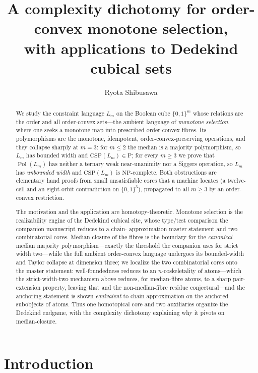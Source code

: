 \documentclass[11pt]{amsart}
\title[A complexity dichotomy for order-convex monotone selection]
{A complexity dichotomy for order-convex monotone selection,\\
 with applications to Dedekind cubical sets}
\author{Ryota Shibusawa}
\theoremstyle{plain}
\theoremstyle{definition}
\DeclareMathOperator{\Pol}{Pol}
\newcommand{\B}{\{0,1\}}
\begin{document}
\begin{abstract}
  We study the constraint language $L_m$ on the Boolean cube $\B^m$ whose
  relations are the order and all order-convex sets---the ambient
  language of \emph{monotone selection}, where one seeks a monotone map
  into prescribed order-convex fibres.  Its polymorphisms are the
  monotone, idempotent, order-convex-preserving operations, and they
  collapse sharply at $m=3$: for $m\le2$ the median is a majority
  polymorphism, so $L_m$ has bounded width and $\mathrm{CSP}(L_m)\in
  \mathrm P$; for every $m\ge3$ we prove that $\Pol(L_m)$ has neither a
  ternary weak near-unanimity nor a Siggers operation, so $L_m$ has
  \emph{unbounded width} and $\mathrm{CSP}(L_m)$ is
  $\mathrm{NP}$-complete.  Both obstructions are elementary hand proofs
  from small unsatisfiable cores that a machine locates (a twelve-cell
  and an eight-orbit contradiction on $\B^3$), propagated to all $m\ge3$
  by an order-convex restriction.

  The motivation and the application are homotopy-theoretic.  Monotone
  selection is the realizability engine of the Dedekind cubical site,
  whose type/test comparison the companion manuscript reduces to a chain-
  approximation master statement and two combinatorial cores.
  Median-closure of the fibres is the boundary for the \emph{canonical}
  median majority polymorphism---exactly the threshold the companion uses
  for strict width two---while the full ambient order-convex language
  undergoes its bounded-width and Taylor collapse at dimension three; we
  localize the two combinatorial cores onto the master statement:
  well-foundedness
  reduces to an $n$-coskeletality of atoms---which the strict-width-two
  mechanism above reduces, for median-fibre atoms, to a sharp
  pair-extension property, leaving that and the non-median-fibre residue
  conjectural---and the anchoring
  statement is shown \emph{equivalent} to chain approximation on the
  anchored subobjects of atoms.  Thus one homotopical core and two
  auxiliaries organize the Dedekind endgame, with the complexity
  dichotomy explaining why it pivots on median-closure.
\end{abstract}

\maketitle

\tableofcontents

\section{Introduction}
\end{document}
